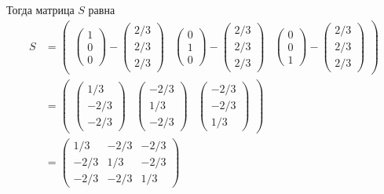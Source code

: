 \documentclass[a4paper,12pt]{article}
\begin{document}
\begin{solution}
    Тогда матрица $S$ равна
    \begin{equation}
    \begin{split}
      S &= \begin{pmatrix}
        \begin{pmatrix}1\\ 0\\ 0\end{pmatrix} - \begin{pmatrix}2/3\\ 2/3\\ 2/3\end{pmatrix}
        & \begin{pmatrix}0\\ 1\\ 0\end{pmatrix} - \begin{pmatrix}2/3\\ 2/3\\ 2/3\end{pmatrix}
        & \begin{pmatrix}0\\ 0\\ 1\end{pmatrix} - \begin{pmatrix}2/3\\ 2/3\\ 2/3\end{pmatrix}
      \end{pmatrix}\\
      &= \begin{pmatrix}
        \begin{pmatrix}1/3\\ -2/3\\ -2/3\end{pmatrix}
        & \begin{pmatrix}-2/3\\ 1/3\\ -2/3\end{pmatrix}
        & \begin{pmatrix}-2/3\\ -2/3\\ 1/3\end{pmatrix}
      \end{pmatrix}\\
      &= \begin{pmatrix}
        1/3 & -2/3 & -2/3\\
        -2/3 & 1/3 & -2/3\\
        -2/3 & -2/3 & 1/3
      \end{pmatrix}
    \end{split}
    \end{equation}
  \end{solution}
\end{document}
